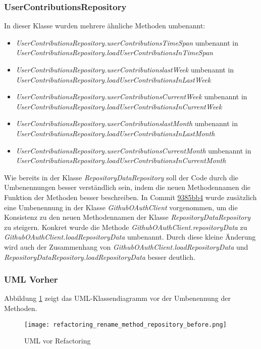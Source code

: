 \subsubsection*{UserContributionsRepository}
In dieser Klasse wurden mehrere ähnliche Methoden umbenannt:
\begin{itemize}
	\item{\textit{UserContributionsRepository.userContributionsTimeSpan} umbenannt in \textit{UserContributionsRepository.loadUserContributionsInTimeSpan}}
	\item{\textit{UserContributionsRepository.userContributionslastWeek} umbenannt in \textit{UserContributionsRepository.loadUserContributionsInLastWeek}}
	\item{\textit{UserContributionsRepository.userContributionsCurrentWeek} umbenannt in \textit{UserContributionsRepository.loadUserContributionsInCurrentWeek}}
	\item{\textit{UserContributionsRepository.userContributionslastMonth} umbenannt in \textit{UserContributionsRepository.loadUserContributionsInLastMonth}}
	\item{\textit{UserContributionsRepository.userContributionsCurrentMonth} umbenannt in \textit{UserContributionsRepository.loadUserContributionsInCurrentMonth}}
\end{itemize}
Wie bereits in der Klasse \textit{RepositoryDataRepository} soll der Code durch die Umbenennungen besser verständlich sein, indem die neuen Methodennamen die Funktion der Methoden besser beschreiben.
\newline
In Commit \href{https://github.com/lukaspanni/OpenSourceStats/commit/9385bb4b9e20b5503e3ea72acd392185f0c533db} {9385bb4} wurde zusätzlich eine Umbenennung in der Klasse \textit{GithubOAuthClient} vorgenommen, um die Konsistenz zu den neuen Methodennamen der Klasse \textit{RepositoryDataRepository} zu steigern.
Konkret wurde die Methode \textit{GithubOAuthClient.repositoryData} zu \textit{GithubOAuthClient.loadRepositoryData} umbenannt. Durch diese kleine Änderung wird auch der Zusammenhang von \textit{GithubOAuthClient.loadRepositoryData} und \textit{RepositoryDataRepository.loadRepositoryData} besser deutlich.

\subsubsection{UML Vorher}
Abbildung \ref{fig:RenameMethod_Refactoring_Before} zeigt das UML-Klassendiagramm vor der Umbenennung der Methoden.
\begin{figure}[h]
  \texttt{[image: refactoring\_rename\_method\_repository\_before.png]}
  \centering
  \caption{UML vor Refactoring}
  \label{fig:RenameMethod_Refactoring_Before}
\end{figure}

